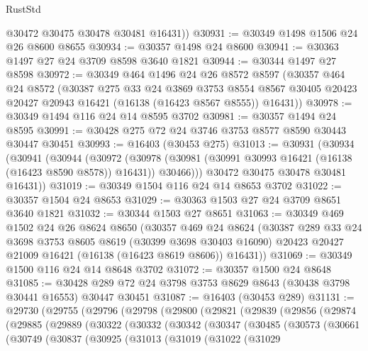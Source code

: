 \begin{lexlean}{RustStd}
\begin{coremodule}
        @30472
        @30475
        @30478
        @30481
        @16431))
@30931 := @30349 @1498 @1506 @24 @26 @8600 @8655
@30934 := @30357 @1498 @24 @8600
@30941 := @30363 @1497 @27 @24 @3709 @8598 @3640 @1821
@30944 := @30344 @1497 @27 @8598
@30972 := @30349
    @464
    @1496
    @24
    @26
    @8572
    @8597
    (@30357
      @464
      @24
      @8572
      (@30387
        @275
        @33
        @24
        @3869
        @3753
        @8554
        @8567
        @30405
        @20423
        @20427
        @20943
        @16421
        (@16138 (@16423 @8567 @8555))
        @16431))
@30978 := @30349 @1494 @116 @24 @14 @8595 @3702
@30981 := @30357 @1494 @24 @8595
@30991 := @30428 @275 @72 @24 @3746 @3753 @8577 @8590 @30443 @30447 @30451
@30993 := @16403 (@30453 @275)
@31013 := @30931
    (@30934
      (@30941
        (@30944
          (@30972
            (@30978 (@30981 (@30991 @30993 @16421 (@16138 (@16423 @8590 @8578)) @16431)) @30466)))
        @30472
        @30475
        @30478
        @30481
        @16431))
@31019 := @30349 @1504 @116 @24 @14 @8653 @3702
@31022 := @30357 @1504 @24 @8653
@31029 := @30363 @1503 @27 @24 @3709 @8651 @3640 @1821
@31032 := @30344 @1503 @27 @8651
@31063 := @30349
    @469
    @1502
    @24
    @26
    @8624
    @8650
    (@30357
      @469
      @24
      @8624
      (@30387
        @289
        @33
        @24
        @3698
        @3753
        @8605
        @8619
        (@30399 @3698 @30403 @16090)
        @20423
        @20427
        @21009
        @16421
        (@16138 (@16423 @8619 @8606))
        @16431))
@31069 := @30349 @1500 @116 @24 @14 @8648 @3702
@31072 := @30357 @1500 @24 @8648
@31085 := @30428 @289 @72 @24 @3798 @3753 @8629 @8643 (@30438 @3798 @30441 @16553) @30447 @30451
@31087 := @16403 (@30453 @289)
@31131 := @29730
    (@29755
      (@29796
        (@29798
          (@29800
            (@29821
              (@29839
                (@29856
                  (@29874
                    (@29885
                      (@29889
                        (@30322
                          (@30332
                            (@30342
                              (@30347
                                (@30485
                                  (@30573
                                    (@30661
                                      (@30749
                                        (@30837
                                          (@30925
                                            (@31013
                                              (@31019
                                                (@31022
                                                  (@31029

\end{coremodule}
\end{lexlean}
